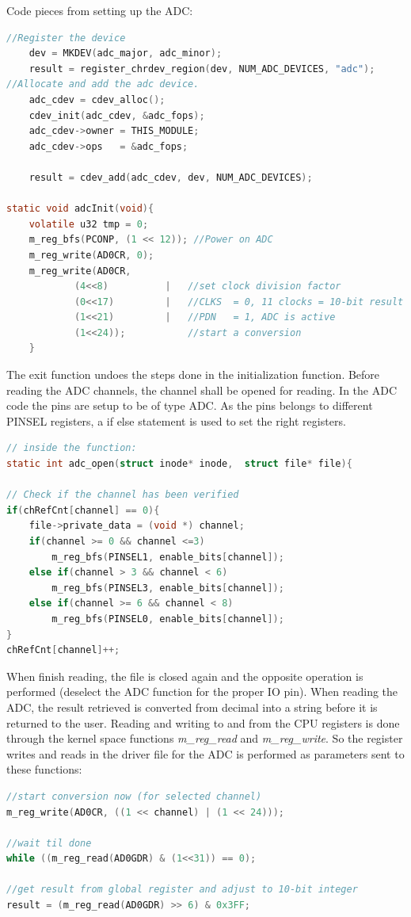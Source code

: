 Code pieces from setting up the ADC:

\begin{lstlisting}[language=c]
//Register the device
	dev = MKDEV(adc_major, adc_minor);
	result = register_chrdev_region(dev, NUM_ADC_DEVICES, "adc");
//Allocate and add the adc device.
	adc_cdev = cdev_alloc();
	cdev_init(adc_cdev, &adc_fops);
	adc_cdev->owner = THIS_MODULE;
	adc_cdev->ops   = &adc_fops;

	result = cdev_add(adc_cdev, dev, NUM_ADC_DEVICES);
	
static void adcInit(void){
	volatile u32 tmp = 0;
	m_reg_bfs(PCONP, (1 << 12)); //Power on ADC
	m_reg_write(AD0CR, 0);
	m_reg_write(AD0CR,
			(4<<8)			|	//set clock division factor
			(0<<17)			|	//CLKS  = 0, 11 clocks = 10-bit result
			(1<<21)			|	//PDN   = 1, ADC is active
			(1<<24));			//start a conversion
	}
\end{lstlisting}
The exit function undoes the steps done in the initialization function.
\p Before reading the ADC channels, the channel shall be opened for reading. In the ADC code the pins are setup to be of type ADC. As the pins belongs to different PINSEL registers, a if else statement is used to set the right registers.
\begin{lstlisting}[language=c]
// inside the function: 
static int adc_open(struct inode* inode,  struct file* file){

// Check if the channel has been verified
if(chRefCnt[channel] == 0){
	file->private_data = (void *) channel;
	if(channel >= 0 && channel <=3)
		m_reg_bfs(PINSEL1, enable_bits[channel]);
	else if(channel > 3 && channel < 6)
		m_reg_bfs(PINSEL3, enable_bits[channel]);
	else if(channel >= 6 && channel < 8)
		m_reg_bfs(PINSEL0, enable_bits[channel]);
}
chRefCnt[channel]++;
\end{lstlisting}
When finish reading, the file is closed again and the opposite operation is performed (deselect the ADC function for the proper IO pin).
\p When reading the ADC, the result retrieved is converted from decimal into a string before it is returned to the user. Reading and writing to and from the CPU registers is done through the kernel space functions \textit{m\_reg\_read} and \textit{m\_reg\_write}. So the register writes and reads in the driver file for the ADC is performed as parameters sent to these functions:
\begin{lstlisting}[language=c]
//start conversion now (for selected channel)
m_reg_write(AD0CR, ((1 << channel) | (1 << 24)));

//wait til done
while ((m_reg_read(AD0GDR) & (1<<31)) == 0);

//get result from global register and adjust to 10-bit integer
result = (m_reg_read(AD0GDR) >> 6) & 0x3FF;
\end{lstlisting}

